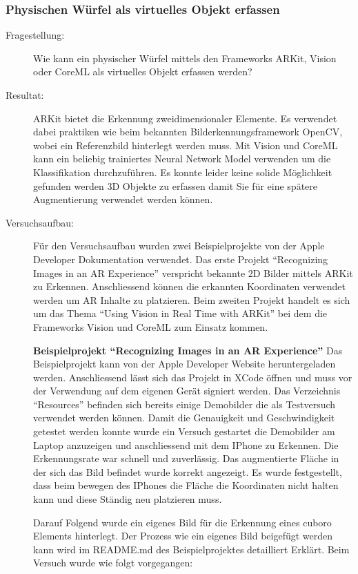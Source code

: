 \subsubsection{Physischen Würfel als virtuelles Objekt erfassen}\label{subsub:prot-physische-wuerfel}
\begin{description}
	\item[Fragestellung:] Wie kann ein physischer Würfel mittels den Frameworks ARKit, Vision oder CoreML als virtuelles Objekt erfassen werden?
	\item[Resultat:] ARKit bietet die Erkennung zweidimensionaler Elemente. Es verwendet dabei praktiken wie beim bekannten Bilderkennungsframework OpenCV, wobei ein Referenzbild hinterlegt werden muss.
	Mit Vision und CoreML kann ein beliebig trainiertes Neural Network Model verwenden um die Klassifikation durchzuführen. Es konnte leider keine solide Möglichkeit gefunden werden 3D Objekte zu erfassen damit Sie für eine spätere Augmentierung verwendet werden können. 
	\item[Versuchsaufbau:] Für den Versuchsaufbau wurden zwei Beispielprojekte von der Apple Developer Dokumentation verwendet. Das erste Projekt "`Recognizing Images in an AR Experience"' \cite{arkit-recognize-images} verspricht bekannte 2D Bilder mittels ARKit zu Erkennen. Anschliessend können die erkannten Koordinaten verwendet werden um AR Inhalte zu platzieren.
	Beim zweiten Projekt handelt es sich um das Thema "`Using Vision in Real Time with ARKit"' \cite{vision-real-time-with-arkit} bei dem die Frameworks Vision und CoreML zum Einsatz kommen.

	\textbf{Beispielprojekt "`Recognizing Images in an AR Experience"'}
	Das Beispielprojekt kann von der Apple Developer Website heruntergeladen werden. Anschliessend lässt sich das Projekt in XCode öffnen und muss vor der Verwendung auf dem eigenen Gerät signiert werden. Das Verzeichnis "`Resources"' befinden sich bereits einige Demobilder die als Testversuch verwendet werden können. Damit die Genauigkeit und Geschwindigkeit getestet werden konnte wurde ein Versuch gestartet die Demobilder am Laptop anzuzeigen und anschliessend mit dem IPhone zu Erkennen. Die Erkennungsrate war schnell und zuverlässig. Das augmentierte Fläche in der sich das Bild befindet wurde korrekt angezeigt. Es wurde festgestellt, dass beim bewegen des IPhones die Fläche die Koordinaten nicht halten kann und diese Ständig neu platzieren muss.

	Darauf Folgend wurde ein eigenes Bild für die Erkennung eines cuboro Elements hinterlegt. Der Prozess wie ein eigenes Bild beigefügt werden kann wird im README.md des Beispielprojektes detailliert Erklärt. Beim Versuch wurde wie folgt vorgegangen: 


\end{description}
